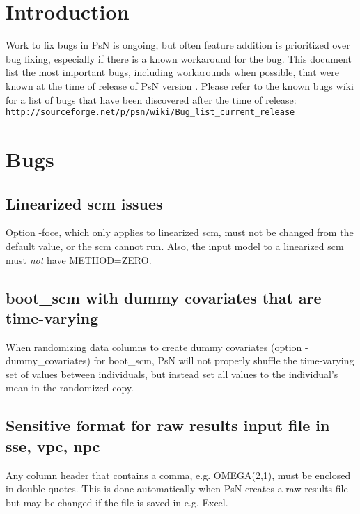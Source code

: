 




\maketitle

\section{Introduction}
Work to fix bugs in PsN is ongoing, but often feature addition is prioritized over bug fixing, 
especially if there is a known workaround for the bug. This document list the most important bugs, including workarounds when possible,
that were known at the time of release of PsN version \psnversion. Please refer to the known bugs wiki
for a list of bugs that have been discovered after the time of release:\\
\texttt{http://sourceforge.net/p/psn/wiki/Bug\_list\_current\_release}   

\section{Bugs}
\subsection{Linearized scm issues}
Option -foce, which only applies to linearized scm, must not be changed from
the default value, or the scm cannot run. 
Also, the input model to a linearized scm must \emph{not}
have METHOD=ZERO.

\subsection{boot\_scm with dummy covariates that are time-varying}
When randomizing data columns to create dummy covariates 
(option -dummy\_covariates) for boot\_scm, PsN will not properly
shuffle the time-varying set of values between individuals,
but instead set all values to the individual's mean in the randomized copy.

\subsection{Sensitive format for raw results input file in sse, vpc, npc}
Any column header that contains a comma, e.g. OMEGA(2,1), must be enclosed in double quotes. This is done automatically when PsN creates a raw results file but may be changed if the file is saved in e.g. Excel.

